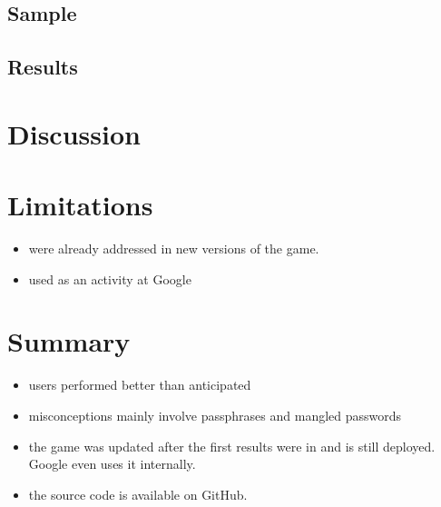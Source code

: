 \subsection{Sample}
\subsection{Results}


\section{Discussion}

\section{Limitations}
\begin{itemize}
	\item were already addressed in new versions of the game. 
	\item used as an activity at Google	
\end{itemize}


\section{Summary}
\begin{itemize}
	\item users performed better than anticipated
	\item misconceptions mainly involve passphrases and mangled passwords
	\item the game was updated after the first results were in and is still deployed. Google even uses it internally. 
	\item the source code is available on GitHub.
\end{itemize}
